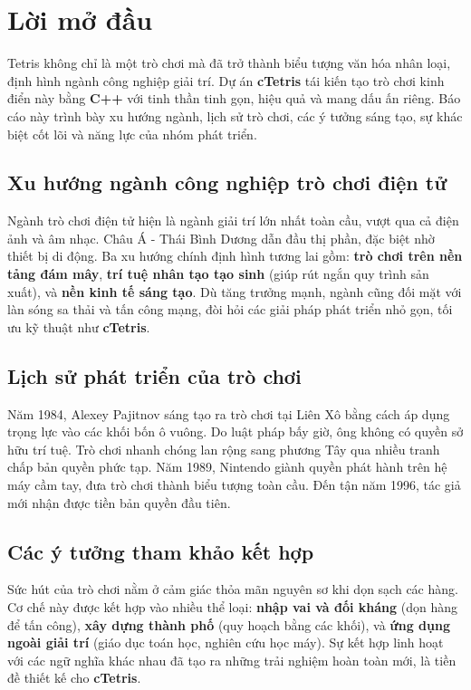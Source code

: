\documentclass[12pt,a4paper]{article}
\begin{document}
\providecommand{\StandaloneSectionSetup}[2]{\ApplyStandardFooter{#1}{#2}}
\StandaloneSectionSetup{01-Preface}{LastPagePreface}
\onehalfspacing

\clearpage
{}
\section*{Lời mở đầu}

Tetris không chỉ là một trò chơi mà đã trở thành biểu tượng văn hóa nhân loại, định hình ngành công nghiệp giải trí. Dự án \textbf{cTetris} tái kiến tạo trò chơi kinh điển này bằng \textbf{C++} với tinh thần tinh gọn, hiệu quả và mang dấu ấn riêng. Báo cáo này trình bày xu hướng ngành, lịch sử trò chơi, các ý tưởng sáng tạo, sự khác biệt cốt lõi và năng lực của nhóm phát triển.

\subsection{Xu hướng ngành công nghiệp trò chơi điện tử}
Ngành trò chơi điện tử hiện là ngành giải trí lớn nhất toàn cầu, vượt qua cả điện ảnh và âm nhạc. Châu Á - Thái Bình Dương dẫn đầu thị phần, đặc biệt nhờ thiết bị di động. Ba xu hướng chính định hình tương lai gồm: \textbf{trò chơi trên nền tảng đám mây}, \textbf{trí tuệ nhân tạo tạo sinh} (giúp rút ngắn quy trình sản xuất), và \textbf{nền kinh tế sáng tạo}. Dù tăng trưởng mạnh, ngành cũng đối mặt với làn sóng sa thải và tấn công mạng, đòi hỏi các giải pháp phát triển nhỏ gọn, tối ưu kỹ thuật như \textbf{cTetris}.

\subsection{Lịch sử phát triển của trò chơi}
Năm 1984, Alexey Pajitnov sáng tạo ra trò chơi tại Liên Xô bằng cách áp dụng trọng lực vào các khối bốn ô vuông. Do luật pháp bấy giờ, ông không có quyền sở hữu trí tuệ. Trò chơi nhanh chóng lan rộng sang phương Tây qua nhiều tranh chấp bản quyền phức tạp. Năm 1989, Nintendo giành quyền phát hành trên hệ máy cầm tay, đưa trò chơi thành biểu tượng toàn cầu. Đến tận năm 1996, tác giả mới nhận được tiền bản quyền đầu tiên.

\subsection{Các ý tưởng tham khảo kết hợp}
Sức hút của trò chơi nằm ở cảm giác thỏa mãn nguyên sơ khi dọn sạch các hàng. Cơ chế này được kết hợp vào nhiều thể loại: \textbf{nhập vai và đối kháng} (dọn hàng để tấn công), \textbf{xây dựng thành phố} (quy hoạch bằng các khối), và \textbf{ứng dụng ngoài giải trí} (giáo dục toán học, nghiên cứu học máy). Sự kết hợp linh hoạt với các ngữ nghĩa khác nhau đã tạo ra những trải nghiệm hoàn toàn mới, là tiền đề thiết kế cho \textbf{cTetris}.
\end{document}
